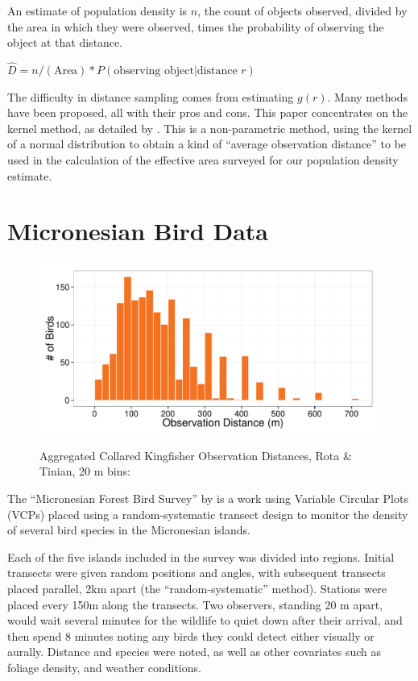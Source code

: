 \documentclass[12pt]{article}
\begin{document}
An estimate of population density is $n$, the count of objects observed, divided by the area in which they were observed, times the probability of observing the object at that distance. \cite{buckland2001} %

$\hat{D}=n/(\mbox{Area})*P(\mbox{observing object}|\mbox{distance }r)$

The difficulty in distance sampling comes from estimating $g(r)$. Many methods have been proposed, all with their pros and cons. This paper concentrates on the kernel method, as detailed by \textcite{quang1993}. This is a non-parametric method, using the kernel of a normal distribution to obtain a kind of ``average observation distance'' to be used in the calculation of the effective area surveyed for our population density estimate.

\section{Micronesian Bird Data}
\begin{figure}
	\caption{Aggregated Collared Kingfisher Observation Distances, Rota \& Tinian, 20 m bins: \cite{micronesian}}
	\includegraphics[width=\textwidth]{../images/histogram_dist_20m.pdf}
	\label{fig:82dist}
\end{figure}
The ``Micronesian Forest Bird Survey'' by \textcite{micronesian} is a work using Variable Circular Plots (VCPs) placed using a random-systematic transect design to monitor the density of several bird species in the Micronesian islands.

Each of the five islands included in the survey was divided into regions. Initial transects were given random positions and angles, with subsequent transects placed parallel, 2km apart (the ``random-systematic'' method). Stations were placed every 150m along the transects. Two observers, standing 20 m apart, would wait several minutes for the wildlife to quiet down after their arrival, and then spend 8 minutes noting any birds they could detect either visually or aurally. Distance and species were noted, as well as other covariates such as foliage density, and weather conditions. 
\end{document}
